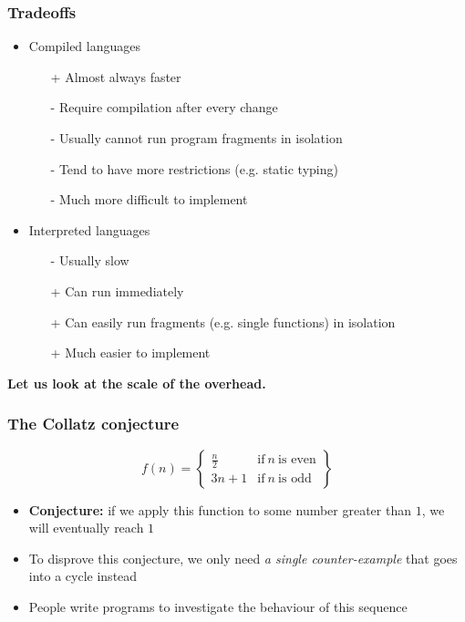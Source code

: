 \documentclass[rgb,dvipsnames,aspectratio=169,xcolor=table]{beamer}
\begin{document}
\begin{frame}
  \frametitle{Tradeoffs}

  \begin{itemize}
  \item Compiled languages
    \begin{itemize}
    \item[+] Almost always faster
    \item[-] Require compilation after every change
    \item[-] Usually cannot run program fragments in isolation
    \item[-] Tend to have more restrictions (e.g. static typing)
    \item[-] Much more difficult to implement
    \end{itemize}\pause
  \item Interpreted languages
    \begin{itemize}
    \item[-] Usually slow
    \item[+] Can run immediately
    \item[+] Can easily run fragments (e.g. single functions) in isolation
    \item[+] Much easier to implement
    \end{itemize}
  \end{itemize}

  \pause\bigskip

  \begin{center}
    \textbf{Let us look at the scale of the overhead.}
  \end{center}

\end{frame}

\begin{frame}
  \frametitle{The Collatz conjecture}

\[
  f(n) = \left\{
    \begin{array}{ll}
      \frac{n}{2} & \text{if}~n~\text{is even} \\
      3n+1 & \text{if}~n~\text{is odd}
    \end{array}
  \right\}
\]

\begin{itemize}
\item \textbf{Conjecture:} if we apply this function to some number
  greater than $1$, we will eventually reach $1$
\item To disprove this conjecture, we only need \textit{a single
    counter-example} that goes into a cycle instead
\item People write programs to investigate the behaviour of this
  sequence
\end{itemize}

\end{frame}
\end{document}
